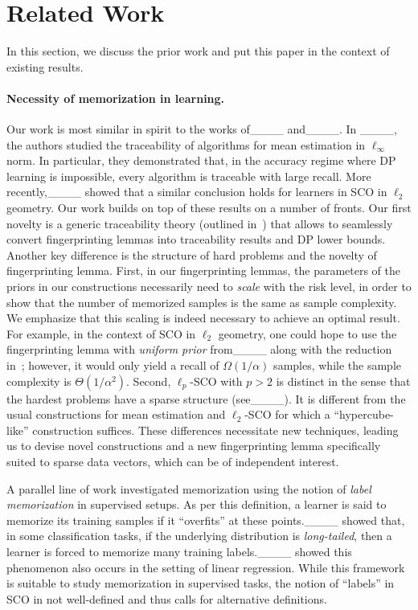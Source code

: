 \section{Related Work}
In this section, we discuss the prior work and put this paper in the context of existing results. 

\paragraph{Necessity of memorization in learning.} 
Our work is most similar in spirit to the works of____ and____. In ____, the authors studied the traceability of algorithms for mean estimation in $\ell_\infty$ norm. In particular, they demonstrated that, in the accuracy regime where DP learning is impossible, every algorithm is traceable with large recall. 
More recently,____ showed that a similar conclusion holds for learners in SCO in $\ell_2$ geometry. Our work builds on top of these results on a number of fronts. Our first novelty is a generic traceability theory (outlined in~) that allows to seamlessly convert fingerprinting lemmas into traceability results and DP lower bounds. 
Another key difference is the structure of hard problems and the novelty of fingerprinting lemma. First, in our fingerprinting lemmas, the parameters of the priors in our constructions necessarily need to \emph{scale} with the risk level, in order to show that the number of memorized samples is the same as sample complexity. 
We emphasize that this scaling is indeed necessary to achieve an optimal result. For example, in the context of SCO in $\ell_2$ geometry, one could hope to use the fingerprinting lemma with \emph{uniform prior} from____ along with the reduction in~\cite[Sec.~5.1]{bassily2014private}; however, it would only yield a recall of $\Omega(1/\alpha)$ samples, while the sample complexity is $\Theta(1/\alpha^2)$.  Second, $\ell_p$-SCO with $p > 2$ is distinct in the sense that the hardest problems have a sparse structure (see____). It is different from the usual constructions for mean estimation and $\ell_2$-SCO for which a ``hypercube-like'' construction suffices.  These differences necessitate new techniques, leading us to devise novel constructions and a new fingerprinting lemma specifically suited to sparse data vectors, which can be of independent interest.

A parallel line of work investigated memorization using the notion of \emph{label memorization} in supervised setups.
As per this definition, a learner is said to memorize its training samples if it ``overfits'' at these points.____ showed that, in some classification tasks, if the underlying distribution is \emph{long-tailed}, then a learner is forced to memorize many training labels.____ showed this phenomenon also occurs in the setting of linear regression. While this framework is suitable to study memorization in supervised tasks, the notion of ``labels'' in SCO in not well-defined and thus calls for alternative definitions.

